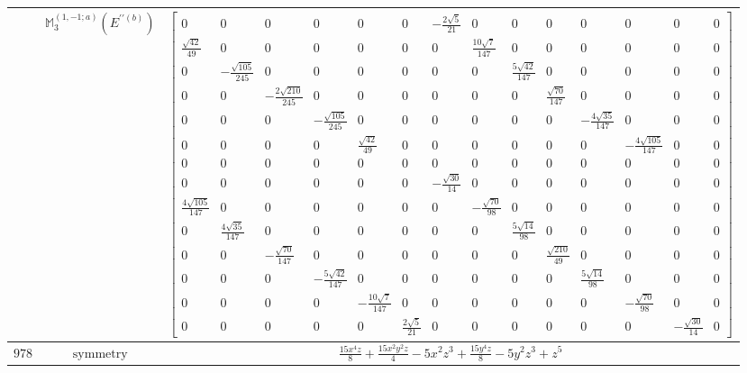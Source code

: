 \documentclass[fleqn,8pt,landscape]{jsarticle}
\begin{document}
\begin{longtable}{ccc}
$  $ & $ \mathbb{M}_{3}^{(1,-1;a)}(E^{\prime\prime(b)}) $ & $ \begin{bmatrix} 0 & 0 & 0 & 0 & 0 & 0 & - \frac{2 \sqrt{5}}{21} & 0 & 0 & 0 & 0 & 0 & 0 & 0 \\ \frac{\sqrt{42}}{49} & 0 & 0 & 0 & 0 & 0 & 0 & \frac{10 \sqrt{7}}{147} & 0 & 0 & 0 & 0 & 0 & 0 \\ 0 & - \frac{\sqrt{105}}{245} & 0 & 0 & 0 & 0 & 0 & 0 & \frac{5 \sqrt{42}}{147} & 0 & 0 & 0 & 0 & 0 \\ 0 & 0 & - \frac{2 \sqrt{210}}{245} & 0 & 0 & 0 & 0 & 0 & 0 & \frac{\sqrt{70}}{147} & 0 & 0 & 0 & 0 \\ 0 & 0 & 0 & - \frac{\sqrt{105}}{245} & 0 & 0 & 0 & 0 & 0 & 0 & - \frac{4 \sqrt{35}}{147} & 0 & 0 & 0 \\ 0 & 0 & 0 & 0 & \frac{\sqrt{42}}{49} & 0 & 0 & 0 & 0 & 0 & 0 & - \frac{4 \sqrt{105}}{147} & 0 & 0 \\ 0 & 0 & 0 & 0 & 0 & 0 & 0 & 0 & 0 & 0 & 0 & 0 & 0 & 0 \\ 0 & 0 & 0 & 0 & 0 & 0 & - \frac{\sqrt{30}}{14} & 0 & 0 & 0 & 0 & 0 & 0 & 0 \\ \frac{4 \sqrt{105}}{147} & 0 & 0 & 0 & 0 & 0 & 0 & - \frac{\sqrt{70}}{98} & 0 & 0 & 0 & 0 & 0 & 0 \\ 0 & \frac{4 \sqrt{35}}{147} & 0 & 0 & 0 & 0 & 0 & 0 & \frac{5 \sqrt{14}}{98} & 0 & 0 & 0 & 0 & 0 \\ 0 & 0 & - \frac{\sqrt{70}}{147} & 0 & 0 & 0 & 0 & 0 & 0 & \frac{\sqrt{210}}{49} & 0 & 0 & 0 & 0 \\ 0 & 0 & 0 & - \frac{5 \sqrt{42}}{147} & 0 & 0 & 0 & 0 & 0 & 0 & \frac{5 \sqrt{14}}{98} & 0 & 0 & 0 \\ 0 & 0 & 0 & 0 & - \frac{10 \sqrt{7}}{147} & 0 & 0 & 0 & 0 & 0 & 0 & - \frac{\sqrt{70}}{98} & 0 & 0 \\ 0 & 0 & 0 & 0 & 0 & \frac{2 \sqrt{5}}{21} & 0 & 0 & 0 & 0 & 0 & 0 & - \frac{\sqrt{30}}{14} & 0 \end{bmatrix} $ \\ \hline
$ 978 $ & $ \text{symmetry} $ & $ \frac{15 x^{4} z}{8} + \frac{15 x^{2} y^{2} z}{4} - 5 x^{2} z^{3} + \frac{15 y^{4} z}{8} - 5 y^{2} z^{3} + z^{5} $ \\

\end{longtable}
\end{document}
